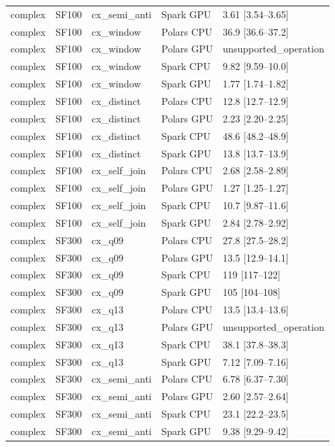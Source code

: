 \begin{longtable}{lllll}
complex & SF100 & cx\_semi\_anti & Spark GPU & 3.61 [3.54--3.65] \\
complex & SF100 & cx\_window & Polars CPU & 36.9 [36.6--37.2] \\
complex & SF100 & cx\_window & Polars GPU & unsupported\_operation \\
complex & SF100 & cx\_window & Spark CPU & 9.82 [9.59--10.0] \\
complex & SF100 & cx\_window & Spark GPU & 1.77 [1.74--1.82] \\
complex & SF100 & cx\_distinct & Polars CPU & 12.8 [12.7--12.9] \\
complex & SF100 & cx\_distinct & Polars GPU & 2.23 [2.20--2.25] \\
complex & SF100 & cx\_distinct & Spark CPU & 48.6 [48.2--48.9] \\
complex & SF100 & cx\_distinct & Spark GPU & 13.8 [13.7--13.9] \\
complex & SF100 & cx\_self\_join & Polars CPU & 2.68 [2.58--2.89] \\
complex & SF100 & cx\_self\_join & Polars GPU & 1.27 [1.25--1.27] \\
complex & SF100 & cx\_self\_join & Spark CPU & 10.7 [9.87--11.6] \\
complex & SF100 & cx\_self\_join & Spark GPU & 2.84 [2.78--2.92] \\
complex & SF300 & cx\_q09 & Polars CPU & 27.8 [27.5--28.2] \\
complex & SF300 & cx\_q09 & Polars GPU & 13.5 [12.9--14.1] \\
complex & SF300 & cx\_q09 & Spark CPU & 119 [117--122] \\
complex & SF300 & cx\_q09 & Spark GPU & 105 [104--108] \\
complex & SF300 & cx\_q13 & Polars CPU & 13.5 [13.4--13.6] \\
complex & SF300 & cx\_q13 & Polars GPU & unsupported\_operation \\
complex & SF300 & cx\_q13 & Spark CPU & 38.1 [37.8--38.3] \\
complex & SF300 & cx\_q13 & Spark GPU & 7.12 [7.09--7.16] \\
complex & SF300 & cx\_semi\_anti & Polars CPU & 6.78 [6.37--7.30] \\
complex & SF300 & cx\_semi\_anti & Polars GPU & 2.60 [2.57--2.64] \\
complex & SF300 & cx\_semi\_anti & Spark CPU & 23.1 [22.2--23.5] \\
complex & SF300 & cx\_semi\_anti & Spark GPU & 9.38 [9.29--9.42] \\

\end{longtable}
